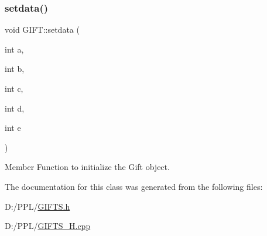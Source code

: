 \subsubsection{\texorpdfstring{setdata()}{setdata()}}
{\footnotesize\ttfamily void G\+I\+F\+T\+::setdata (\begin{DoxyParamCaption}\item[{int}]{a,  }\item[{int}]{b,  }\item[{int}]{c,  }\item[{int}]{d,  }\item[{int}]{e }\end{DoxyParamCaption})}



Member Function to initialize the Gift object. 



The documentation for this class was generated from the following files\+:\begin{DoxyCompactItemize}
\item 
D\+:/\+P\+P\+L/\hyperlink{_g_i_f_t_s_8h}{G\+I\+F\+T\+S.\+h}\item 
D\+:/\+P\+P\+L/\hyperlink{_g_i_f_t_s___h_8cpp}{G\+I\+F\+T\+S\+\_\+\+H.\+cpp}\end{DoxyCompactItemize}
